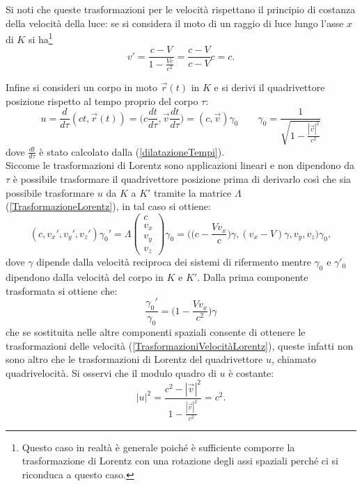 Si noti che queste trasformazioni per le velocità rispettano il principio di costanza della velocità della luce: se si considera il moto di un raggio di luce lungo l'asse $x$ di $K$ si ha\footnote{Questo caso in realtà è generale poiché è sufficiente comporre la trasformazione di Lorentz con una rotazione degli assi spaziali perché ci si riconduca a questo caso.} 
\begin{equation*}
    v'=\frac{c-V}{1-\frac{Vc}{c^2}}=\frac{c-V}{c-V}c=c.
\end{equation*}

Infine si consideri un corpo in moto $\vec r(t)$ in $K$ e si derivi il quadrivettore posizione rispetto al tempo proprio del corpo $\tau$:
\begin{equation}
    u=\frac{d }{d\tau}(ct,\vec r(t))=\bigg(c\frac{dt}{d\tau},\vec v\frac{dt}{d\tau}\bigg)=(c,\vec v)\gamma_0 \qquad \gamma_0=\frac{1}{\sqrt{1-\frac{|\vec v|^2}{c^2}}}
    \label{defQuadrivelocità}
\end{equation}
dove $\frac{dt}{d\tau}$ è stato calcolato dalla (\ref{dilatazioneTempi}).\\
Siccome le trasformazioni di Lorentz sono applicazioni lineari e non dipendono da $\tau$ è possibile trasformare il quadrivettore posizione prima di derivarlo così che sia possibile trasformare $u$ da $K$ a $K'$ tramite la matrice $\Lambda$ (\ref{TrasformazioneLorentz}), in tal caso si ottiene:
\begin{equation*}
       (c,  v_x',  v_y', v_z')\gamma_0'=\Lambda    
    \begin{pmatrix}
        c \\ v_x \\ v_y \\ v_z
     \end{pmatrix}\gamma_0=\bigg(\bigg(c-\frac{Vv_x}{c}\bigg)\gamma, (v_x-V)\gamma, v_y,  v_z\bigg)\gamma_0,
\end{equation*}
dove $\gamma$ dipende dalla velocità reciproca dei sistemi di rifermento mentre $\gamma_0$ e $\gamma'_0$ dipendono dalla velocità del corpo in $K$ e $K'$. Dalla prima componente trasformata si ottiene che:
\begin{equation}
    \frac{\gamma_0'}{\gamma_0}=\bigg(1-\frac{Vv_x}{c^2}\bigg)\gamma
\end{equation}
che se sostituita nelle altre componenti spaziali consente di ottenere le trasformazioni delle velocità (\ref{TrasformazioniVelocitàLorentz}), queste infatti non sono altro che le trasformazioni di Lorentz del quadrivettore $u$, chiamato quadrivelocità. Si osservi che il modulo quadro di $u$ è costante:
\begin{equation*}
    |u|^2=\frac{c^2-|\vec v|^2}{1-\frac{|\vec v|^2}{c^2}}=c^2.
\end{equation*} 